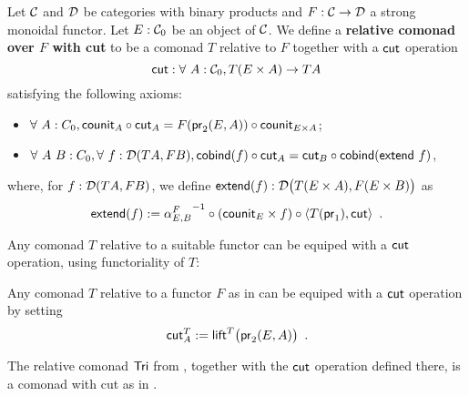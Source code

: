 \documentclass{amsart}
\newcommand{\fat}[1]{\textbf{#1}}
\begin{document}
\begin{definition}\label{def:rel_comonad_with_cut}
 Let $\C$ and $\D$ be categories with binary products and $F:\C\to\D$ a strong monoidal functor. Let $E:\C_0$ be an object of $\C$.
 We define a \fat{relative comonad over $F$ with cut} to be a comonad $T$ relative to $F$ together with a $\cut$ operation 
    \[ \cut : \forall~A:\C_0, T(E\times A) \to TA \]
 satisfying the following axioms:
  \begin{itemize}
   \item $\forall~A:C_0, \comp{\cut_A}{\counit_A} = \comp{\counit_{E\times A}}{F(\pr_2(E,A))}$;
   \item $\forall~A~B:C_0,\forall~f:\D(TA,FB), \comp{\cut_A}{\cobind(f)} = \comp{\cobind(\extend~f)}{\cut_B}$,
  \end{itemize}

  \noindent
  where, for $f:\D(TA,FB)$, we define $\extend(f) : \D\bigl(T(E\times A),F(E\times B)\bigr)$ as
       \[ \extend(f) := \comp{\comp{\langle T(\pr_1) , \cut \rangle}{(\counit_E\times f)}}{{\alpha^{F}_{E,B}}^{-1}} \enspace . \]
  
\end{definition}

Any comonad $T$ relative to a suitable functor can be equiped with a $\cut$ operation, using functoriality of $T$:


\begin{remark}
 Any comonad $T$ relative to a functor $F$ as in  can be equiped with a $\cut$ operation by setting
   \[ \cut^T_A := \lift^T\bigl(\pr_2(E,A)\bigr) \enspace . \]
\end{remark}



\begin{example}
  The relative comonad $\Tri$ from , together with the $\cut$ operation defined there, 
  is a comonad with cut as in .
      
\end{example}
\end{document}
